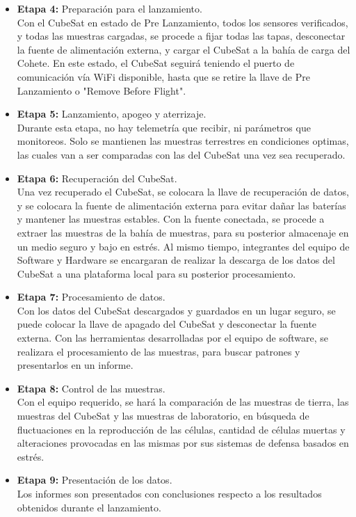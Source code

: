 \begin{itemize}
    \item \textbf{Etapa 4:} Preparación para el lanzamiento.\\
      Con el CubeSat en estado de Pre Lanzamiento, todos los sensores verificados, y todas las muestras cargadas, se
      procede a fijar todas las tapas, desconectar la fuente de alimentación externa, y cargar el CubeSat a la bahía de
      carga del Cohete. En este estado, el CubeSat seguirá teniendo el puerto de comunicación vía WiFi disponible, hasta
      que se retire la llave de Pre Lanzamiento o "Remove Before Flight".
    \item \textbf{Etapa 5:} Lanzamiento, apogeo y aterrizaje.\\
      Durante esta etapa, no hay telemetría que recibir, ni parámetros que monitoreos. Solo se mantienen las muestras
      terrestres en condiciones optimas, las cuales van a ser comparadas con las del CubeSat una vez sea recuperado.
    \item \textbf{Etapa 6:} Recuperación del CubeSat.\\
      Una vez recuperado el CubeSat, se colocara la llave de recuperación de datos, y se colocara la fuente de
      alimentación externa para evitar dañar las baterías y mantener las muestras estables. Con la fuente conectada, se
      procede a extraer las muestras de la bahía de muestras, para su posterior almacenaje en un medio seguro y bajo en
      estrés. Al mismo tiempo, integrantes del equipo de Software y Hardware se encargaran de realizar la descarga de
      los datos del CubeSat a una plataforma local para su posterior procesamiento.
    \item \textbf{Etapa 7:} Procesamiento de datos.\\
      Con los datos del CubeSat descargados y guardados en un lugar seguro, se puede colocar la llave de apagado del
      CubeSat y desconectar la fuente externa. Con las herramientas desarrolladas por el equipo de software, se
      realizara el procesamiento de las muestras, para buscar patrones y presentarlos en un informe.
    \item \textbf{Etapa 8:} Control de las muestras.\\
      Con el equipo requerido, se hará la comparación de las muestras de tierra, las muestras del CubeSat y las muestras
      de laboratorio, en búsqueda de fluctuaciones en la reproducción de las células, cantidad de células muertas y
      alteraciones provocadas en las mismas por sus sistemas de defensa basados en estrés.
    \item \textbf{Etapa 9:} Presentación de los datos.\\
      Los informes son presentados con conclusiones respecto a los resultados obtenidos durante el lanzamiento.
  \end{itemize}

